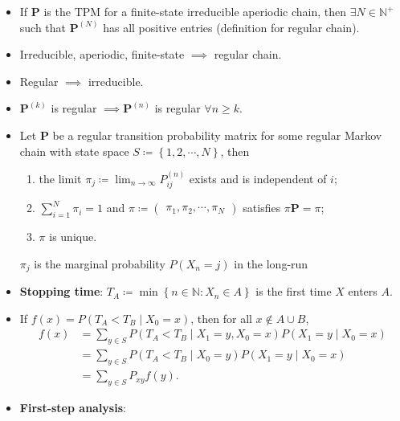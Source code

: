 \documentclass[10pt]{article}
\begin{document}
\begin{multicols*}{2}
\begin{itemize}
            \item If $\bm{P}$ is the TPM for a finite-state irreducible aperiodic chain, then $\exists N \in \mathbb{N}^+$ such that $\bm{P}^{\left(N\right)}$ has all positive entries (definition for regular chain).
            \item Irreducible, aperiodic, finite-state $\implies$ regular chain.
            \item Regular $\implies$ irreducible.
            \item $\bm{P}^{\left(k\right)}$ is regular $\implies \bm{P}^{\left(n\right)}$ is regular $\forall n \geq k$.
            \item Let $\bm{P}$ be a regular transition probability matrix for some regular Markov chain with state space $S \coloneqq \left\{1, 2, \cdots, N\right\}$, then 
            \begin{enumerate}
                \item the limit $\pi_j \coloneqq \lim_{n \to \infty}P^{\left(n\right)}_{ij}$ exists and is independent of $i$;
                \item $\sum_{i = 1}^{N}\pi_i = 1$ and $\pi \coloneqq \begin{pmatrix}
                    \pi_1, \pi_2, \cdots, \pi_N
                \end{pmatrix}$ satisfies $\pi\bm{P} = \pi$;
                \item $\pi$ is unique.
            \end{enumerate}
            $\pi_j$ is the marginal probability $P\left(X_n = j\right)$ in the long-run
            \item \textbf{Stopping time}: $T_A \coloneqq \min\left\{n \in \mathbb{N} \colon X_n \in A\right\}$ is the first time $X$ enters $A$.
            \item If $f\left(x\right) = P\left(T_A < T_B \mid X_0 = x\right)$, then for all $x \notin A \cup B$,
            \begin{align*}
                f\left(x\right) & = \sum_{y \in S}P\left(T_A < T_B \mid X_1 = y, X_0 = x\right)P\left(X_1 = y \mid X_0 = x\right) \\
                & = \sum_{y \in S}P\left(T_A < T_B \mid X_0 = y\right)P\left(X_1 = y \mid X_0 = x\right) \\
                & = \sum_{y \in S}P_{xy}f\left(y\right).
            \end{align*}
            \item \textbf{First-step analysis}:
            \begin{enumerate}

\end{enumerate}
\end{itemize}
\end{multicols*}
\end{document}
